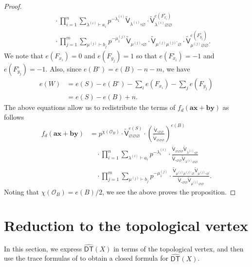 \documentclass[12pt]{amsart}
\theoremstyle{definition}
\renewcommand{\O}{\mathcal{O}}
\newcommand{\sfVtilde}{\widetilde{\mathsf{V}}}
\newcommand{\DT}{\mathsf{DT}}
\newcommand{\boldx}{\boldsymbol{x}}
\newcommand{\boldy}{\boldsymbol{y}}
\newcommand{\bolda}{\boldsymbol{a}}
\newcommand{\boldb}{\boldsymbol{b}}
\renewcommand{\emptyset}{\varnothing}
\newcommand{\DThat}{\widehat{\DT}}
\newcommand{\bx}{\square}
\newcommand{\mujprime}{\mu^{(j)\prime}}
\newcommand{\presectionspace}{\vspace{0.2cm}} %
\begin{document}
\begin{proof}
\begin{align*}
&\quad \cdot \prod_{i=1}^{n} \sum_{\lambda^{(i)}\vdash a_{i}}
p^{-\lambda_{1}^{(i)}} \sfVtilde_{\lambda^{(i)}\bx \emptyset} \cdot
\sfVtilde^{e(F^{\circ}_{x_{i}})}_{\lambda^{(i)}\emptyset \emptyset}\\
&\quad \cdot \prod_{j=1}^{m} \sum_{\mu^{(j)}\vdash b_{j}}
p^{-\mu_{1}^{(j)}} \sfVtilde_{\mu^{(j)} \bx \emptyset} \cdot
\sfVtilde_{\mu^{(j)} \mujprime \emptyset }\cdot
\sfVtilde^{e(F^{\circ}_{y_{j}})}_{\mu^{(j)}\emptyset \emptyset}.
\end{align*}
We note that $e(F_{x_{i}})=0$ and $e(F_{y_{j}})=1$ so that
$e(F^{\circ }_{x_{i}})=-1$ and $e(F^{\circ }_{y_{j}})=-1$. Also,
since $e(B^{\circ}) = e(B)-n-m$, we have
\begin{align*}
e(W)&= e(S) - e(B^{\circ}) - \sum_{i} e(F_{x_{i}}) - \sum_{j} e(F_{y_{j}})\\
&= e(S) - e(B) +n.
\end{align*}
The above equations allow us to redistribute the terms of
$f_{d}(\bolda \boldx +\boldb \boldy )$ as follows
\begin{align*}
f_{d}(\bolda \boldx +\boldb \boldy ) &= p^{\chi (\O_{B})} \cdot
\sfVtilde^{e(S)}_{\emptyset \emptyset \emptyset} \cdot
\left(\frac{\sfVtilde_{\bx \emptyset \emptyset}}{\sfVtilde_{\emptyset
\emptyset \emptyset}} \right)^{e(B)} \\
&\quad \cdot \prod_{i=1}^{n} \sum_{\lambda^{(i)} \vdash a_{i}}
p^{-\lambda_{1}^{(i)}} \cdot \frac{\sfVtilde_{\emptyset \emptyset
\emptyset} \sfVtilde_{\lambda^{(i)} \bx  \emptyset}}{\sfVtilde_{\bx
\emptyset \emptyset} \sfVtilde_{\lambda^{(i)}\emptyset \emptyset}} \\
&\quad \cdot \prod_{j=1}^{m} \sum_{\mu^{(j)} \vdash b_{j}}
p^{-\mu_{1}^{(j)}} \cdot \frac{\sfVtilde_{\mu^{(j)} \mujprime
\emptyset} \sfVtilde_{\mu^{(j)} \bx \emptyset}}{\sfVtilde_{\bx
\emptyset \emptyset} \sfVtilde_{\mu^{(j)}\emptyset \emptyset}}.
\end{align*}
Noting that $\chi (\O_{B}) = e(B)/2$, we see the above proves the proposition.
\end{proof}


\presectionspace
\section{Reduction to the topological vertex} \label{sec: reduction to the vertex}

In this section, we express $\DThat (X)$ in terms of the topological
vertex, and then use the trace formulas of \cite{Bryan-Kool-Young} to
obtain a closed formula for $\DThat (X)$.
\end{document}
